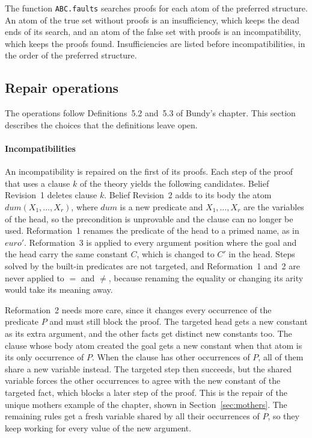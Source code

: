 \documentclass[preprint,12pt]{elsarticle}
\newcommand{\isa}[1]{\texttt{#1}}
\begin{document}
The function \isa{ABC.faults} searches proofs for each atom of the
preferred structure. An atom of the true set without proofs is an
insufficiency, which keeps the dead ends of its search, and an atom of the
false set with proofs is an incompatibility, which keeps the proofs found.
Insufficiencies are listed before incompatibilities, in the order of the
preferred structure.

\subsection{Repair operations}
\label{sec:operations}

The operations follow Definitions~5.2 and~5.3 of Bundy's chapter. This
section describes the choices that the definitions leave open.

\paragraph{Incompatibilities}
An incompatibility is repaired on the first of its proofs. Each step of the
proof that uses a clause $k$ of the theory yields the following candidates.
Belief Revision~1 deletes clause $k$. Belief Revision~2 adds to its body the
atom $\mathit{dum}(X_1,\dots,X_r)$, where $\mathit{dum}$ is a new predicate
and $X_1,\dots,X_r$ are the variables of the head, so the precondition is
unprovable and the clause can no longer be used. Reformation~1 renames the
predicate of the head to a primed name, as in $\mathit{euro}'$.
Reformation~3 is applied to every argument position where the goal and the
head carry the same constant $C$, which is changed to $C'$ in the head.
Steps solved by the built-in predicates are not targeted, and Reformation~1
and~2 are never applied to $=$ and $\neq$, because renaming the equality or
changing its arity would take its meaning away.

Reformation~2 needs more care, since it changes every occurrence of the
predicate $P$ and must still block the proof. The targeted head gets a new
constant as its extra argument, and the other facts get distinct new
constants too. The clause whose body atom created the goal gets a new
constant when that atom is its only occurrence of $P$. When the clause has
other occurrences of $P$, all of them share a new variable instead. The
targeted step then succeeds, but the shared variable forces the other
occurrences to agree with the new constant of the targeted fact, which
blocks a later step of the proof. This is the repair of the unique mothers
example of the chapter, shown in Section~\ref{sec:mothers}. The remaining
rules get a fresh variable shared by all their occurrences of $P$, so they
keep working for every value of the new argument.
\end{document}
